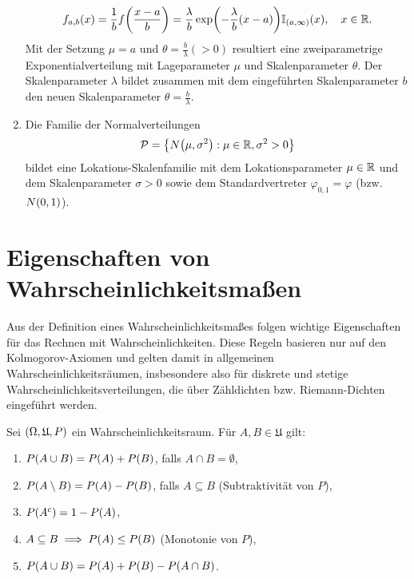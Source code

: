 \documentclass{lecture}
\begin{document}
\begin{example}
\begin{enumerate}
            \[
                f_{a, b}\parentheses*{x} = \frac{1}{b}f\parentheses*{\frac{x - a}{b}} = \frac{\lambda}{b}\exp\parentheses*{-\frac{\lambda}{b}\parentheses*{x - a}}\mathbb{I}_{\parentheses*{a, \infty}}\parentheses*{x}, \quad x \in \R.
            \]
            Mit der Setzung \(\mu = a\) und \(\theta = \frac{b}{\lambda} (> 0)\) resultiert eine zweiparametrige Exponentialverteilung mit Lageparameter \(\mu\) und Skalenparameter \(\theta\).
            Der Skalenparameter \(\lambda\) bildet zusammen mit dem eingeführten Skalenparameter \(b\) den neuen Skalenparameter \(\theta = \frac{b}{\lambda}\).
            \item Die Familie der Normalverteilungen
            \[
                \mathcal{P} = \braces*{N\parentheses*{\mu, \sigma^2} : \mu \in \R, \sigma^2 > 0}
            \]
            bildet eine Lokations-Skalenfamilie mit dem Lokationsparameter \(\mu \in \R\) und dem Skalenparameter \(\sigma > 0\) sowie dem Standardvertreter \(\varphi_{0, 1} = \varphi\) (bzw. \(N\parentheses*{0, 1}\)).
        \end{enumerate}
    \end{example}


    \section*{Eigenschaften von Wahrscheinlichkeitsmaßen}

    Aus der Definition eines Wahrscheinlichkeitsmaßes folgen wichtige Eigenschaften für das Rechnen mit Wahrscheinlichkeiten.
    Diese Regeln basieren nur auf den Kolmogorov-Axiomen und gelten damit in allgemeinen Wahrscheinlichkeitsräumen, insbesondere also für diskrete und stetige Wahrscheinlichkeitsverteilungen, die über Zähldichten bzw. Riemann-Dichten eingeführt werden.

    \begin{lemma}
        Sei \(\parentheses*{\Omega, \mathfrak{U}, P}\) ein Wahrscheinlichkeitsraum.
        Für \(A, B \in \mathfrak{U}\) gilt:
        \begin{enumerate}
            \item \(P\parentheses*{A \cup B} = P\parentheses*{A} + P\parentheses*{B}\), falls \(A \cap B = \emptyset\),
            \item \(P\parentheses*{A \setminus B} = P\parentheses*{A} - P\parentheses*{B}\), falls \(A \subseteq B\) (Subtraktivität von \(P\)),
            \item \(P\parentheses*{A^c} = 1 - P\parentheses*{A}\),
            \item \(A \subseteq B \implies P\parentheses*{A} \le P\parentheses*{B}\) (Monotonie von \(P\)),
            \item \(P\parentheses*{A \cup B} = P\parentheses*{A} + P\parentheses*{B} - P\parentheses*{A \cap B}\).
        \end{enumerate}
    \end{lemma}
\end{document}
